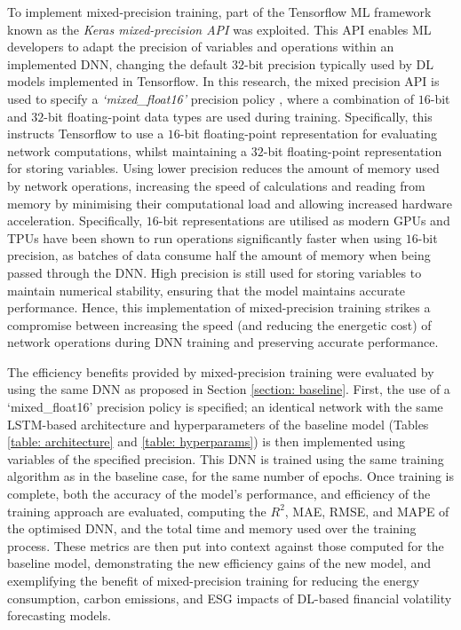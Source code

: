 \documentclass[a4paper, 11pt]{report}
\begin{document}
    To implement mixed-precision training, part of the Tensorflow ML framework \citep{abadi-2016} known as the \emph{Keras mixed-precision API} was exploited. This API enables ML developers to adapt the precision of variables and operations within an implemented DNN, changing the default $32$-bit precision typically used by DL models implemented in Tensorflow. In this research, the mixed precision API is used to specify a \emph{`mixed\_float16'} precision policy \citep{abadi-2016}, where a combination of $16$-bit and $32$-bit floating-point data types are used during training. Specifically, this instructs Tensorflow to use a $16$-bit floating-point representation for evaluating network computations, whilst maintaining a $32$-bit floating-point representation for storing variables. Using lower precision reduces the amount of memory used by network operations, increasing the speed of calculations and reading from memory by minimising their computational load and allowing increased hardware acceleration. Specifically, $16$-bit representations are utilised as modern GPUs and TPUs have been shown to run operations significantly faster when using $16$-bit precision, as batches of data consume half the amount of memory when being passed through the DNN. High precision is still used for storing variables to maintain numerical stability, ensuring that the model maintains accurate performance. Hence, this implementation of mixed-precision training strikes a compromise between increasing the speed (and reducing the energetic cost) of network operations during DNN training and preserving accurate performance.

    The efficiency benefits provided by mixed-precision training were evaluated by using the same DNN as proposed in Section \ref{section: baseline}. First, the use of a `mixed\_float16' precision policy is specified; an identical network with the same LSTM-based architecture and hyperparameters of the baseline model (Tables \ref{table: architecture} and \ref{table: hyperparams}) is then implemented using variables of the specified precision. This DNN is trained using the same training algorithm as in the baseline case, for the same number of epochs. Once training is complete, both the accuracy of the model's performance, and efficiency of the training approach are evaluated, computing the $R^2$, MAE, RMSE, and MAPE of the optimised DNN, and the total time and memory used over the training process. These metrics are then put into context against those computed for the baseline model, demonstrating the new efficiency gains of the new model, and exemplifying the benefit of mixed-precision training for reducing the energy consumption, carbon emissions, and ESG impacts of DL-based financial volatility forecasting models.
\end{document}
